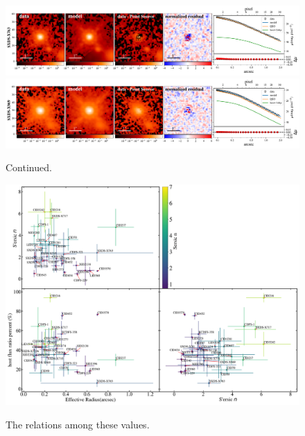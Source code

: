 \documentclass[apj]{emulateapj}
\begin{document}
\begin{figure}
\centering
{
\includegraphics[height=0.25\textwidth]{fig/best_fit_SXDS-X763_SB_profile.pdf}
\includegraphics[height=0.25\textwidth]{fig/best_fit_SXDS-X969_SB_profile.pdf}
}
\caption{Continued.}
\end{figure} 

\begin{figure}
\centering
{
\includegraphics[height=0.75\textwidth]{fig/flux_r_n_corner.pdf}
}
\caption{\label{fig:flux_r_n_corner} The relations among these values.}
\end{figure} 

\end{document}
